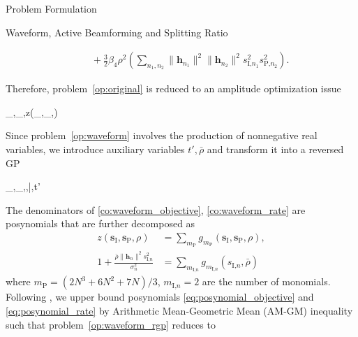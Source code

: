\documentclass[journal]{IEEEtran}
\begin{document}
\begin{section}{Problem Formulation}
\begin{subsection}{Waveform, Active Beamforming and Splitting Ratio}
\begin{figure*}[b]
\begin{align}
					& \quad + \frac{3}{2}{\beta_4}{\rho^2} \left( \sum_{n_1,n_2} \lVert{\boldsymbol{h}_{n_1}}\rVert^2 \lVert{\boldsymbol{h}_{n_2}}\rVert^2 s_{\text{I,}{n_1}}^2 s_{\text{P,}{n_2}}^2 \right).\label{eq:z_waveform}
				\end{align}
			\end{figure*}%
			Therefore, problem~\eqref{op:original} is reduced to an amplitude optimization issue
			\begin{maxi!}
				{_{},_,\rho}{z(_{},_,\rho)}{\label{op:waveform}}{}
			\end{maxi!}
			Since problem~\eqref{op:waveform} involves the production of nonnegative real variables, we introduce auxiliary variables $t',\bar{\rho}$ and transform it into a reversed GP
			\begin{mini!}
				{_{},_,\rho,\bar{\rho},t'}{}{\label{op:waveform_rgp}}{}
				\label{co:waveform_power}
				\label{co:waveform_objective}
				\label{co:waveform_rate}
			\end{mini!}
			The denominators of \eqref{co:waveform_objective}, \eqref{co:waveform_rate} are posynomials \cite{Boyd2007} that are further decomposed as
			\begin{align}
				z(\boldsymbol{s}_{\text{I}},\boldsymbol{s}_\text{P},\rho)&=\sum_{m_\text{P}}{g_{m_\text{P}}(\boldsymbol{s}_{\text{I}},\boldsymbol{s}_\text{P},\rho)}\label{eq:posynomial_objective},\\
				1+\frac{\bar{\rho}\lVert{\boldsymbol{h}_n}\rVert^2 s_{\text{I,}n}^2}{\sigma_n^2}&=\sum_{m_{\text{I,}n}}g_{m_{\text{I,}n}}(s_{\text{I,}n},\bar{\rho})\label{eq:posynomial_rate}
			\end{align}
			where $m_\text{P}=(2N^3+6N^2+7N)/3$, $m_{\text{I,}n}=2$ are the number of monomials. Following \cite{Chiang2005}, we upper bound posynomials \eqref{eq:posynomial_objective} and \eqref{eq:posynomial_rate} by Arithmetic Mean-Geometric Mean (AM-GM) inequality such that problem~\eqref{op:waveform_rgp} reduces to

\end{subsection}
\end{section}
\end{document}
